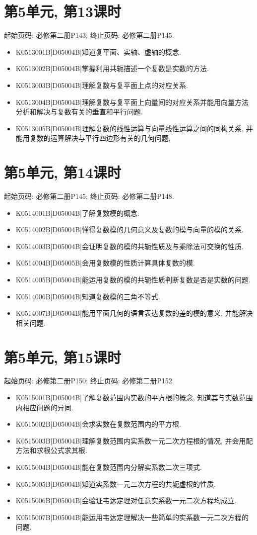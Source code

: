 \section*{第5单元, 第13课时}
起始页码: 必修第二册P143; 终止页码: 必修第二册P145.
\begin{itemize}
\item K0513001B|D05004B|知道复平面、实轴、虚轴的概念.
\item K0513002B|D05004B|掌握利用共轭描述一个复数是实数的方法.
\item K0513003B|D05004B|理解复数与复平面上点的对应关系.
\item K0513004B|D05004B|理解复数与复平面上向量间的对应关系并能用向量方法分析和解决与复数有关的垂直和平行问题.
\item K0513005B|D05004B|理解复数的线性运算与向量线性运算之间的同构关系, 并能用复数的运算解决与平行四边形有关的几何问题.
\end{itemize}

\section*{第5单元, 第14课时}
起始页码: 必修第二册P145; 终止页码: 必修第二册P148.
\begin{itemize}
\item K0514001B|D05004B|了解复数模的概念.
\item K0514002B|D05004B|懂得复数模的几何意义及复数的模与向量的模的关系.
\item K0514003B|D05004B|会证明复数的模的共轭性质及与乘除法可交换的性质.
\item K0514004B|D05005B|会用复数模的性质计算具体复数的模.
\item K0514005B|D05004B|能运用复数的模的共轭性质判断复数是否是实数的问题.
\item K0514006B|D05004B|知道复数模的三角不等式.
\item K0514007B|D05004B|能用平面几何的语言表达复数的差的模的意义, 并能解决相关问题.
\end{itemize}

\section*{第5单元, 第15课时}
起始页码: 必修第二册P150; 终止页码: 必修第二册P152.
\begin{itemize}
\item K0515001B|D05004B|了解复数范围内实数的平方根的概念, 知道其与实数范围内相应问题的异同.
\item K0515002B|D05004B|会求实数在复数范围内的平方根.
\item K0515003B|D05004B|理解复数范围内实系数一元二次方程根的情况, 并会用配方法和求根公式求其根.
\item K0515004B|D05004B|能在复数范围内分解实系数二次三项式.
\item K0515005B|D05004B|知道实系数一元二次方程的共轭虚根的性质.
\item K0515006B|D05004B|会验证韦达定理对任意实系数一元二次方程均成立.
\item K0515007B|D05004B|能运用韦达定理解决一些简单的实系数一元二次方程的问题.
\end{itemize}

